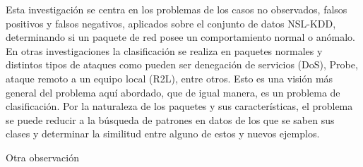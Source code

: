 Esta investigación se centra en los problemas de los casos no observados, falsos positivos y falsos negativos, aplicados sobre el conjunto de datos NSL-KDD, determinando si un paquete de red posee un comportamiento normal o anómalo. En otras investigaciones la clasificación se realiza en paquetes normales y distintos tipos de ataques como pueden ser denegación de servicios (DoS), Probe, ataque remoto a un equipo local (R2L), entre otros. Esto es una visión más general del problema aquí abordado, que de igual manera, es un problema de clasificación. Por la naturaleza de los paquetes y sus características, el problema se puede reducir a la búsqueda de patrones en datos de los que se saben sus clases y determinar la similitud entre alguno de estos y nuevos ejemplos.
    
Otra observación








